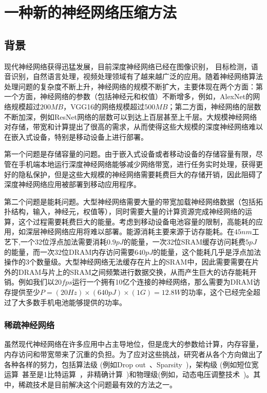 \chapter{一种新的神经网络压缩方法}

\section{背景}
现代神经网络获得迅猛发展，目前深度神经网络已经在图像识别， 目标检测，语音识别，自然语言处理，视频处理领域有了越来越广泛的应用。随着神经网络算法处理问题的复杂度不断上升，神经网络的规模不断扩大，主要体现在两个方面：第一个方面，神经网络的参数（包括神经元和权值）不断增多，例如，AlexNet的网络规模超过$200MB$，VGG16的网络规模超过$500MB$；第二方面，神经网络的层数不断加深，例如ResNet网络的层数可以到达上百层甚至上千层。大规模神经网络对存储，带宽和计算提出了很高的需求，从而使得这些大规模的深度神经网络难以在嵌入式设备，特别是移动设备上进行部署。

第一个问题是存储容量的问题。由于嵌入式设备或者移动设备的存储容量有限，尽管在手机端本地运行深度神经网络能够减少网络带宽，进行任务实时处理，获得更好的隐私保护，但是这些大规模的神经网络需要耗费巨大的存储开销，因此阻碍了深度神经网络应用被部署到移动应用程序。

第二个问题是能耗问题。大型神经网络需要大量的带宽加载神经网络数据（包括拓扑结构，输入，神经元，权值等），同时需要大量的计算资源完成神经网络的运算，这个过程需要耗费巨大的能量。考虑到移动设备电池容量的限制，高能耗的应用，如深层神经网络应用将难以部署。能源消耗主要来源于访存能耗。在$45nm$工艺下,一个32位浮点加法需要消耗$0.9pJ$的能量，一次32位SRAM缓存访问耗费$5pJ$的能量，而一次32位DRAM内存访问需要$640pJ$的能量，这个能耗几乎是浮点加法操作的3个数量级。大型神经网络无法缓存在片上的SRAM中，因此需要需要在片外的DRAM与片上的SRAM之间频繁进行数据交换，从而产生巨大的访存能耗开销。例如我们以$20fps$运行一个拥有10亿个连接的神经网络，那么需要为DRAM访存提供至少$P = (20Hz)\times (640pJ)\times (1G) = 12.8W$的功率，这个已经完全超过了大多数手机电池能够提供的功率。


\subsection{稀疏神经网络}
虽然现代神经网络在许多应用中占主导地位，但是庞大的参数给计算，内存容量，内存访问和带宽带来了沉重的负担。为了应对这些挑战，研究者从各个方向做出了各种各样的努力，包括算法级 (例如Drop out~\cite{srivastava2014dropout}、Sparsity~\cite{han2015learning})，架构级 (例如短位宽运算~\cite{holi1993finite}甚至是1比特运算~\cite{rastegari2016xnor}，非精确计算~\cite{venkataramani2014axnn})和物理级(例如，动态电压调整技术~\cite{pillai2001real})。其中，稀疏技术是目前解决这个问题最有效的方法之一。

